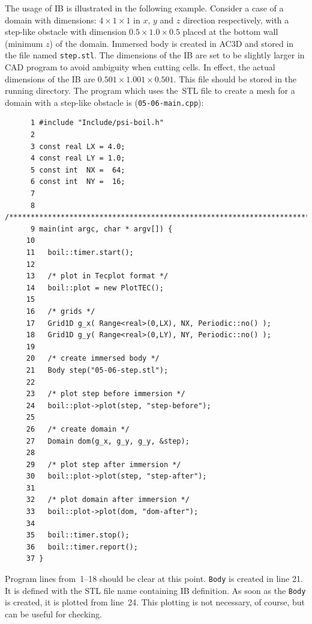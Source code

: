 The usage of IB is illustrated in the following example. Consider a case of a domain
with dimensions: $4 \times 1 \times 1$ in $x$, $y$ and $z$ direction
respectively, with a step-like obstacle with dimension 
$0.5 \times 1.0 \times 0.5$ placed at the bottom wall (minimum $z$) 
of the domain. Immersed body is created in AC3D and stored in the file named {\tt step.stl}.
The dimensions of the IB are set to be slightly larger in CAD program
to avoid ambiguity when cutting cells. In effect, the actual dimensions of the IB are
$0.501 \times 1.001 \times 0.501$.
This file should be stored in the running directory. The program which uses the~STL
file to create a mesh for a domain with a step-like obstacle is ({\tt 05-06-main.cpp}): 
%
{\small \begin{verbatim}
      1 #include "Include/psi-boil.h"
      2
      3 const real LX = 4.0;
      4 const real LY = 1.0;
      5 const int  NX =  64;
      6 const int  NY =  16;
      7
      8 /******************************************************************************/
      9 main(int argc, char * argv[]) {
     10
     11   boil::timer.start();
     12
     13   /* plot in Tecplot format */
     14   boil::plot = new PlotTEC();
     15
     16   /* grids */
     17   Grid1D g_x( Range<real>(0,LX), NX, Periodic::no() );
     18   Grid1D g_y( Range<real>(0,LY), NY, Periodic::no() );
     19
     20   /* create immersed body */
     21   Body step("05-06-step.stl");
     22
     23   /* plot step before immersion */
     24   boil::plot->plot(step, "step-before");
     25
     26   /* create domain */
     27   Domain dom(g_x, g_y, g_y, &step);
     28
     29   /* plot step after immersion */
     30   boil::plot->plot(step, "step-after");
     31
     32   /* plot domain after immersion */
     33   boil::plot->plot(dom, "dom-after");
     34
     35   boil::timer.stop();
     36   boil::timer.report();
     37 }
\end{verbatim}}
%
Program lines from~1--18 should be clear at this point. {\tt Body} is created
in line 21. It is defined with the STL file name containing IB definition. As soon
as the {\tt Body} is created, it is plotted from line~24. This plotting is not
necessary, of course, but can be useful for checking. 

